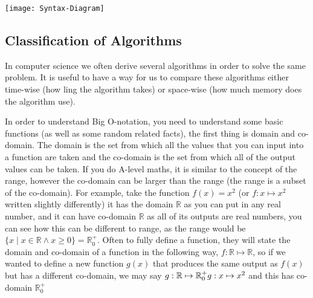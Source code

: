   \texttt{[image: Syntax-Diagram]}
  
\subsection{Classification of Algorithms}
  
  \noindent
  In computer science we often derive several algorithms in order to solve the same problem. It is useful to have a way for us to compare these algorithms either time-wise (how ling the algorithm takes) or space-wise (how much memory does the algorithm use).
  
  \noindent
  In order to understand Big O-notation, you need to understand some basic functions (as well as some random related facts), the first thing is domain and co-domain. The domain is the set from which all the values that you can input into a function are taken and the co-domain is the set from which all of the output values can be taken. If you do A-level maths, it is similar to the concept of the range, however the co-domain can be larger than the range (the range is a subset of the co-domain). For example, take the function $f(x)=x^2$ (or $f: x \mapsto x^2$ written slightly differently) it has the domain $\mathbb{R}$ as you can put in any real number, and it can have co-domain $\mathbb{R}$ as all of its outputs are real numbers, you can see how this can be different to range, as the range would be $\{x \mid x \in \mathbb{R} \wedge x \geq 0\} = \mathbb{R}_0^+$. Often to fully define a function, they will state the domain and co-domain of a function in the following way, $f: \mathbb{R} \mapsto \mathbb{R}$, so if we wanted to define a new function $g(x)$ that produces the same output as $f(x)$ but has a different co-domain, we may say $g: \mathbb{R} \mapsto \mathbb{R}_0^+ \\ g: x \mapsto x^2$ and this has co-domain $\mathbb{R}_0^+$
  
